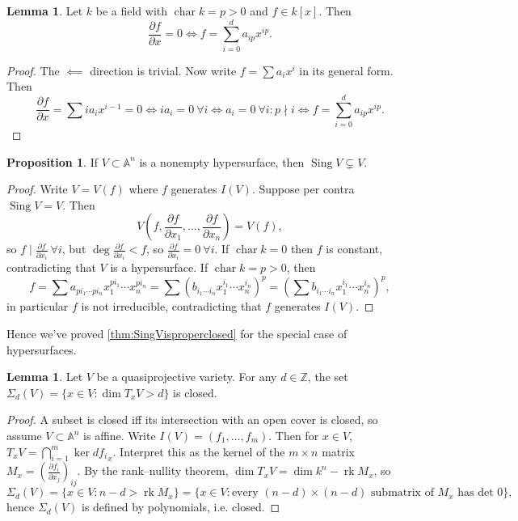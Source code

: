 \documentclass{article}
\newcommand{\Z}{\mathbb{Z}}
\newcommand{\A}{\mathbb{A}}
\newcommand{\Char}{\operatorname{char}}
\newcommand{\rk}{\operatorname{rk}}
\newcommand{\Sing}{\operatorname{Sing}}
\theoremstyle{definition}
\newtheorem{prop}[defn]{Proposition}
\newtheorem{lemma}[defn]{Lemma}
\begin{document}
\begin{lemma}
Let $k$ be a field with $\Char k=p>0$ and $f\in k[x]$. Then
\[
\frac{\partial f}{\partial x}=0\iff f=\sum_{i=0}^d a_{ip}x^{ip}.
\]
\end{lemma}
\begin{proof}
The $\impliedby$ direction is trivial. Now write $f=\sum a_ix^i$ in its general form. Then
\[
\frac{\partial f}{\partial x}=\sum ia_ix^{i-1}=0\iff ia_i=0 \ \forall i\iff a_i=0 \ \forall i:p\nmid i\iff f=\sum_{i=0}^d a_{ip}x^{ip}.
\]
\end{proof}

\begin{prop}
\label{prop:SingHclosedprop}
If $V\subset\A^n$ is a nonempty hypersurface, then $\Sing V\subsetneq V$.
\end{prop}
\begin{proof}
Write $V=V(f)$ where $f$ generates $I(V)$. Suppose per contra $\Sing V=V$. Then
\[
V\left(f,\frac{\partial f}{\partial x_1},\ldots,\frac{\partial f}{\partial x_n}\right)=V(f),
\]
so $f\mid\frac{\partial f}{\partial x_i} \ \forall i$, but $\deg \frac{\partial f}{\partial x_i}<f$, so $\frac{\partial f}{\partial x_i}=0 \ \forall i$. If $\Char k=0$ then $f$ is constant, contradicting that $V$ is a hypersurface. If $\Char k=p>0$, then
\[
f=\sum a_{pi_1\cdots pi_n}x_1^{pi_1}\cdots x_n^{pi_n}=\sum \left(b_{i_1\cdots i_n}x_1^{i_1}\cdots x_n^{i_n}\right)^p=\left(\sum b_{i_1\cdots i_n}x_1^{i_1}\cdots x_n^{i_n}\right)^p,
\]
in particular $f$ is not irreducible, contradicting that $f$ generates $I(V)$.
\end{proof}
Hence we've proved \ref{thm:SingVisproperclosed} for the special case of hypersurfaces.

\begin{lemma}
\label{lemma:SigmadVisclosed}
Let $V$ be a quasiprojective variety. For any $d\in\Z$, the set $\Sigma_d(V)=\{x\in V:\dim T_xV>d\}$ is closed.
\end{lemma}
\begin{proof}
A subset is closed iff its intersection with an open cover is closed, so assume $V\subset\A^n$ is affine. Write $I(V)=(f_1,\ldots,f_m)$. Then for $x\in V$, $T_xV=\bigcap_{i=1}^m\ker d{f_i}_x$. Interpret this as the kernel of the $m\times n$ matrix $M_x=\left(\frac{\partial f_i}{\partial x_j}\right)_{ij}$. By the rank--nullity theorem, $\dim T_xV=\dim k^n-\rk M_x$, so
\[
\Sigma_d(V)=\{x\in V:n-d>\rk M_x\}=\{x\in V:\text{every }(n-d)\times (n-d)\text{ submatrix of }M_x\text{ has det }0\},
\]
hence $\Sigma_d(V)$ is defined by polynomials, i.e. closed.
\end{proof}
\end{document}
